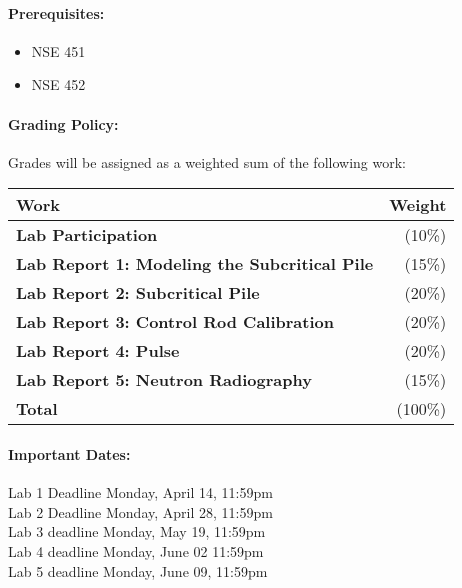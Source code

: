 \documentclass[11pt, a4paper]{article}
\begin{document}
\paragraph{Prerequisites:}
\begin{itemize}
\item NSE 451
\item NSE 452
\end{itemize}

\paragraph{Grading Policy:} Grades will be assigned as a weighted sum of the following work:

\begin{table}[h]
\begin{tabularx}{\textwidth}{Xr}
\textbf{Work} & \textbf{Weight}\\
\hline
\textbf{Lab Participation} & (10\%) \\
\textbf{Lab Report 1: Modeling the Subcritical Pile} & (15\%) \\
\textbf{Lab Report 2: Subcritical Pile} & (20\%) \\
\textbf{Lab Report 3: Control Rod Calibration} & (20\%) \\
\textbf{Lab Report 4: Pulse} & (20\%) \\
\textbf{Lab Report 5: Neutron Radiography} & (15\%) \\
\hline
\textbf{Total} & (100\%) \\
\end{tabularx}
\end{table}

\paragraph{Important Dates:}
\begin{center} \begin{minipage}{3.8in}
\begin{flushleft}
Lab 1 Deadline      \dotfill Monday, April 14, 11:59pm  \\
Lab 2 Deadline      \dotfill Monday, April 28, 11:59pm  \\
Lab 3 deadline      \dotfill Monday, May 19, 11:59pm  \\
Lab 4 deadline      \dotfill Monday, June 02 11:59pm  \\
Lab 5 deadline      \dotfill Monday, June 09, 11:59pm  \\
\end{flushleft}
\end{minipage}
\end{center}
\end{document}
